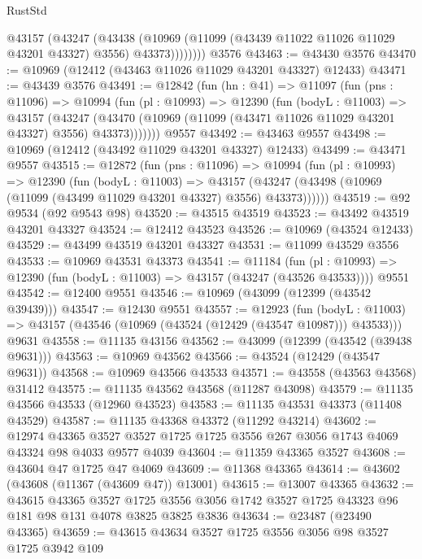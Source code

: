 \begin{lexlean}{RustStd}
\begin{coremodule}
            @43157
              (@43247
                (@43438
                  (@10969 (@11099 (@43439 @11022 @11026 @11029 @43201 @43327) @3556) @43373))))))))
    @3576
@43463 := @43430 @3576
@43470 := @10969 (@12412 (@43463 @11026 @11029 @43201 @43327) @12433)
@43471 := @43439 @3576
@43491 := @12842
    (fun (hn : @41) =>
    @11097
      (fun (pns : @11096) =>
      @10994
        (fun (pl : @10993) =>
        @12390
          (fun (bodyL : @11003) =>
          @43157
            (@43247
              (@43470 (@10969 (@11099 (@43471 @11026 @11029 @43201 @43327) @3556) @43373)))))))
    @9557
@43492 := @43463 @9557
@43498 := @10969 (@12412 (@43492 @11029 @43201 @43327) @12433)
@43499 := @43471 @9557
@43515 := @12872
    (fun (pns : @11096) =>
    @10994
      (fun (pl : @10993) =>
      @12390
        (fun (bodyL : @11003) =>
        @43157 (@43247 (@43498 (@10969 (@11099 (@43499 @11029 @43201 @43327) @3556) @43373))))))
@43519 := @92 @9534 (@92 @9543 @98)
@43520 := @43515 @43519
@43523 := @43492 @43519 @43201 @43327
@43524 := @12412 @43523
@43526 := @10969 (@43524 @12433)
@43529 := @43499 @43519 @43201 @43327
@43531 := @11099 @43529 @3556
@43533 := @10969 @43531 @43373
@43541 := @11184
    (fun (pl : @10993) => @12390 (fun (bodyL : @11003) => @43157 (@43247 (@43526 @43533))))
    @9551
@43542 := @12400 @9551
@43546 := @10969 (@43099 (@12399 (@43542 @39439)))
@43547 := @12430 @9551
@43557 := @12923
    (fun (bodyL : @11003) => @43157 (@43546 (@10969 (@43524 (@12429 (@43547 @10987))) @43533)))
    @9631
@43558 := @11135 @43156
@43562 := @43099 (@12399 (@43542 (@39438 @9631)))
@43563 := @10969 @43562
@43566 := @43524 (@12429 (@43547 @9631))
@43568 := @10969 @43566 @43533
@43571 := @43558 (@43563 @43568) @31412
@43575 := @11135 @43562 @43568 (@11287 @43098)
@43579 := @11135 @43566 @43533 (@12960 @43523)
@43583 := @11135 @43531 @43373 (@11408 @43529)
@43587 := @11135 @43368 @43372 (@11292 @43214)
@43602 := @12974
    @43365
    @3527
    @3527
    @1725
    @1725
    @3556
    @267
    @3056
    @1743
    @4069
    @43324
    @98
    @4033
    @9577
    @4039
@43604 := @11359 @43365 @3527
@43608 := @43604 @47 @1725 @47 @4069
@43609 := @11368 @43365
@43614 := @43602 (@43608 (@11367 (@43609 @47)) @13001)
@43615 := @13007 @43365
@43632 := @43615
    @43365
    @3527
    @1725
    @3556
    @3056
    @1742
    @3527
    @1725
    @43323
    @96
    @181
    @98
    @131
    @4078
    @3825
    @3825
    @3836
@43634 := @23487 (@23490 @43365)
@43659 := @43615
    @43634
    @3527
    @1725
    @3556
    @3056
    @98
    @3527
    @1725
    @3942
    @109

\end{coremodule}
\end{lexlean}

